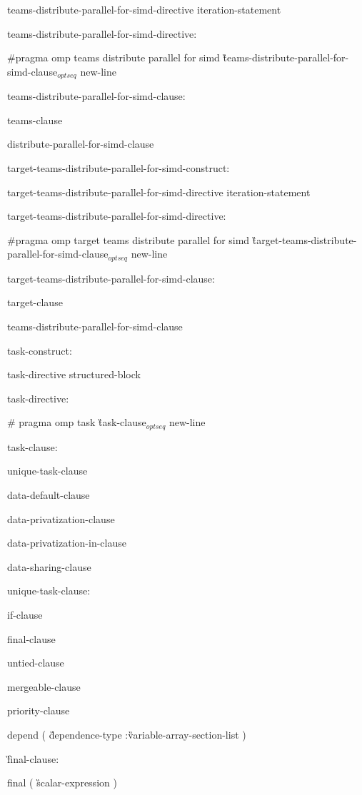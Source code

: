 {\I\I teams-distribute-parallel-for-simd-directive iteration-statement

\I teams-distribute-parallel-for-simd-directive:

\C\I \#pragma omp teams distribute parallel for simd \G teams-distribute-parallel-for-simd-clause$_{optseq}$ new-line

\I teams-distribute-parallel-for-simd-clause:

\I\I teams-clause

\I\I distribute-parallel-for-simd-clause

\I target-teams-distribute-parallel-for-simd-construct:

\I\I target-teams-distribute-parallel-for-simd-directive iteration-statement

\I target-teams-distribute-parallel-for-simd-directive:

\C\I\I \#pragma omp target teams distribute parallel for simd \G target-teams-distribute-parallel-for-simd-clause$_{optseq}$ new-line

\I target-teams-distribute-parallel-for-simd-clause:

\I\I target-clause

\I\I teams-distribute-parallel-for-simd-clause

\I task-construct:

\I\I task-directive structured-block

\I task-directive:

\C\I\I \# pragma omp task \G task-clause$_{optseq}$ new-line

task-clause:

\I unique-task-clause

\I data-default-clause

\I data-privatization-clause

\I data-privatization-in-clause

\I data-sharing-clause

unique-task-clause:

\I if-clause

\I final-clause

\I untied-clause

\I mergeable-clause 

\I priority-clause

\C\I depend ( \G dependence-type \C :\G variable-array-section-list \C )

\G final-clause:

\C\I final ( \G scalar-expression \C )

}
